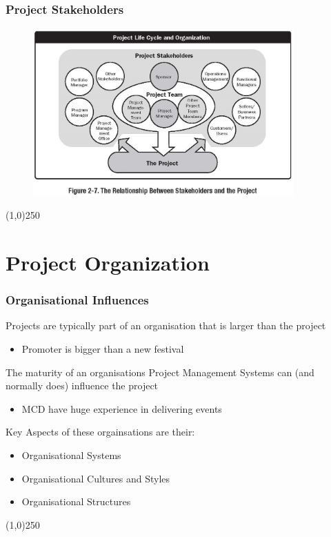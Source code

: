 \begin{frame}
\frametitle{Project Stakeholders}
 \begin{figure}
 	\centering
 		\includegraphics[width = 10cm]{images/Fig2-7.jpg}
 	\label{fig:2-7}
 \end{figure}
\end{frame}
\begin{center}\line(1,0){250}\end{center}






\section{Project Organization}



\begin{frame}
\frametitle{Organisational Influences}
Projects are typically part of an organisation that is larger than the project\\
\begin{itemize}
	\item Promoter is bigger than a new festival
\end{itemize}
The maturity of an organisations Project Management Systems can (and normally does) influence the project\\
\begin{itemize}
	\item MCD have huge experience in delivering events
\end{itemize}
Key Aspects of these orgainsations are their:\\
	\begin{itemize}
		\item Organisational Systems
		\item Organisational Cultures and Styles
		\item Organisational Structures
	\end{itemize}
\end{frame}
\begin{center}\line(1,0){250}\end{center}



